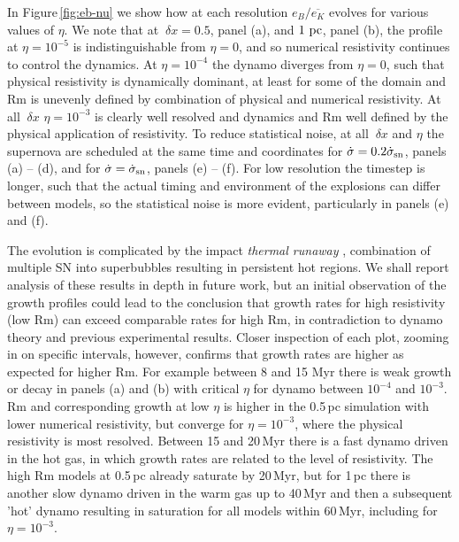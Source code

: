 \documentclass[preprint2]{aastex63}
\newcommand\SNr{\dot\sigma_{\rm sn}}
\newcommand\pc{~ {\rm pc}}
\newcommand\dx{~ {\delta x}}
\begin{document}
In Figure\,\ref{fig:eb-nu} we show how at each resolution $e_B/\overline{e_K}$
evolves for various values of $\eta$.
We note that at $\dx=0.5$, panel (a), and $1\pc$, panel (b), the profile
at $\eta=10^{-5}$ is indistinguishable from $\eta=0$, and so numerical
resistivity continues to control the dynamics.
At $\eta=10^{-4}$ the dynamo diverges from $\eta=0$, such that physical resistivity
is dynamically dominant, at least for some of the domain and Rm is unevenly
defined by combination of physical and numerical resistivity.
At all $\dx$ $\eta=10^{-3}$ is clearly well resolved and dynamics and
Rm well defined by the physical application of resistivity.
To reduce statistical noise, at all $\dx$ and $\eta$ the supernova are
scheduled at the same time and coordinates for $\dot\sigma=0.2\SNr$,
panels (a) -- (d), and for $\dot\sigma=\SNr$, panels (e) -- (f).
For low resolution the timestep is longer, such that the actual timing and 
environment of the explosions can differ between models, so the statistical
noise is more evident, particularly in panels (e) and (f). 

The evolution is complicated by the impact \emph{thermal runaway}
\citep[see e.g.,][]{LOCBN15}, combination of multiple SN into superbubbles
resulting in persistent hot regions.
We shall report analysis of these results in depth in future work, but an 
initial observation of the growth profiles could lead to the conclusion that
growth rates for high resistivity (low Rm) can exceed comparable rates for high
Rm, in contradiction to dynamo theory and previous experimental results.
Closer inspection of each plot, zooming in on specific intervals, however,
confirms that growth rates are higher as expected for higher Rm.
For example between 8 and 15 Myr there is weak growth or decay in panels (a)
and (b) with critical $\eta$ for dynamo between $10^{-4}$ and $10^{-3}$.
Rm and corresponding growth at low $\eta$ is higher in the 0.5\,pc simulation
with lower numerical resistivity, but 
converge for $\eta=10^{-3}$, where the physical resistivity is most resolved.
Between 15 and 20\,Myr there is a fast dynamo driven in the hot gas, in which
growth rates are related to the level of resistivity.
The high Rm models at 0.5\,pc already saturate by 20\,Myr, but for 1\,pc there
is another slow dynamo driven in the warm gas up to 40\,Myr and then a
subsequent 'hot' dynamo resulting in saturation for all models within 60\,Myr,
including for $\eta=10^{-3}$.
\end{document}
